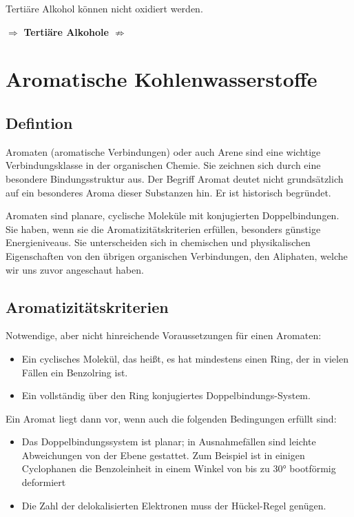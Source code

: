 \documentclass[a4paper]{report}
\begin{document}
Tertiäre Alkohol können nicht oxidiert werden.

\begin{center}
    $\Rightarrow$ \textbf{Tertiäre Alkohole $\nRightarrow$}
\end{center}

\chapter{Aromatische Kohlenwasserstoffe}
\section{Defintion}
Aromaten (aromatische Verbindungen) oder auch Arene sind eine wichtige Verbindungsklasse in der organischen Chemie. Sie zeichnen sich durch eine besondere Bindungsstruktur aus. Der Begriff Aromat deutet nicht grundsätzlich auf ein besonderes Aroma dieser Substanzen hin. Er ist historisch begründet.

Aromaten sind planare, cyclische Moleküle mit konjugierten Doppelbindungen. Sie haben, wenn sie die Aromatizitätskriterien erfüllen, besonders günstige Energieniveaus. Sie unterscheiden sich in chemischen und physikalischen Eigenschaften von den übrigen organischen Verbindungen, den Aliphaten, welche wir uns zuvor angeschaut haben. 

\section{Aromatizitätskriterien}
Notwendige, aber nicht hinreichende Voraussetzungen für einen Aromaten:
\begin{itemize}
    \item Ein cyclisches Molekül, das heißt, es hat mindestens einen Ring, der in vielen Fällen ein Benzolring ist. 
    \item Ein vollständig über den Ring konjugiertes Doppelbindungs-System. 
\end{itemize}
Ein Aromat liegt dann vor, wenn auch die folgenden Bedingungen erfüllt sind: 
\begin{itemize}
    \item Das Doppelbindungssystem ist planar; in Ausnahmefällen sind leichte Abweichungen von der Ebene gestattet. Zum Beispiel ist in einigen Cyclophanen die Benzoleinheit in einem Winkel von bis zu 30° bootförmig deformiert
    \item Die Zahl der delokalisierten Elektronen muss der Hückel-Regel genügen. 
\end{itemize}
\end{document}
